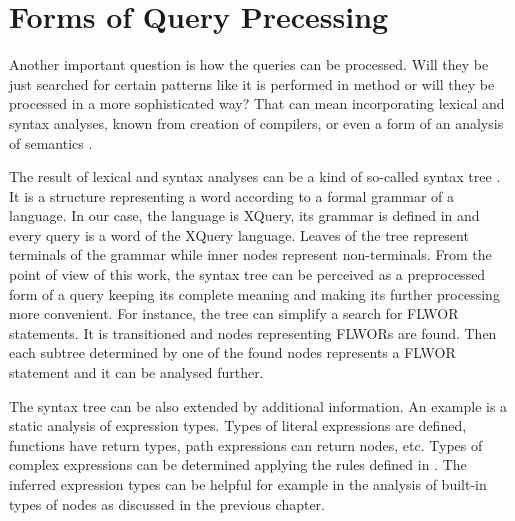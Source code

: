 
\section{Forms of Query Precessing}
Another important question is how the queries can be processed. Will they be just searched for certain patterns like it is performed in method \cite{Necasky:2009:DXK:1529282.1529414} or will they be processed in a more sophisticated way? That can mean incorporating lexical and syntax analyses, known from creation of compilers, or even a form of an analysis of semantics \cite{compilers}.

The result of lexical and syntax analyses can be a kind of so-called syntax tree \cite{compilers}. It is a structure representing a word according to a formal grammar of a language. In our case, the language is XQuery, its grammar is defined in \cite{w3c_xquery} and every query is a word of the XQuery language. Leaves of the tree represent terminals of the grammar while inner nodes represent non-terminals.  From the point of view of this work, the syntax tree can be perceived as a preprocessed form of a query keeping its complete meaning and making its further processing more convenient. For instance, the tree can simplify a search for FLWOR statements. It is transitioned and nodes representing FLWORs are found. Then each subtree determined by one of the found nodes represents a FLWOR statement and it can be analysed further.


The syntax tree can be also extended by additional information. An example is a static analysis of expression types. Types of literal expressions are defined, functions have return types, path expressions can return nodes, etc. Types of complex expressions can be determined applying the rules defined in \cite{w3c_xquery}. The inferred expression types can be helpful for example in the analysis of built-in types of nodes as discussed in the previous chapter. 

